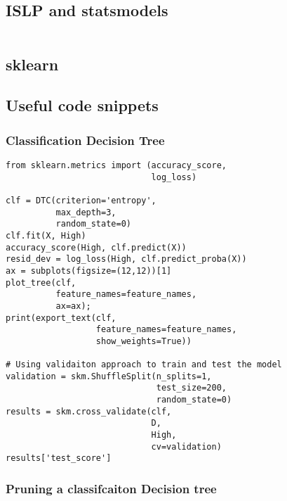 \documentclass[
  letterpaper,
  DIV=11,
  numbers=noendperiod]{scrreprt}
\begin{document}
\begin{verbatim}

\end{verbatim}

\subsection{ISLP and statsmodels}\label{islp-and-statsmodels-4}

\begin{verbatim}

\end{verbatim}

\subsection{sklearn}\label{sklearn-4}

\subsection{Useful code snippets}\label{useful-code-snippets-1}

\subsubsection{Classification Decision
Tree}\label{classification-decision-tree}

\begin{verbatim}
from sklearn.metrics import (accuracy_score,
                             log_loss)
                             
clf = DTC(criterion='entropy',
          max_depth=3,
          random_state=0)        
clf.fit(X, High)
accuracy_score(High, clf.predict(X))
resid_dev = log_loss(High, clf.predict_proba(X))
ax = subplots(figsize=(12,12))[1]
plot_tree(clf,
          feature_names=feature_names,
          ax=ax);
print(export_text(clf,
                  feature_names=feature_names,
                  show_weights=True))
                  
# Using validaiton approach to train and test the model
validation = skm.ShuffleSplit(n_splits=1,
                              test_size=200,
                              random_state=0)
results = skm.cross_validate(clf,
                             D,
                             High,
                             cv=validation)
results['test_score']
\end{verbatim}

\subsubsection{Pruning a classifcaiton Decision
tree}\label{pruning-a-classifcaiton-decision-tree}
\end{document}
